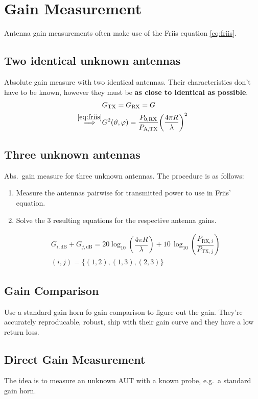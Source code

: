 \section{Gain Measurement}
Antenna gain measurements often make use of the Friis equation \eqref{eq:friis}.

\subsection{Two identical unknown antennas}

Absolute gain measure with two identical antennas.
Their characteristics don't have to be known, however they must be \textbf{as close to identical as possible}.
\begin{align}
  &G_{\text{TX}} = G_{\text{RX}} = G\nonumber\\
  \EqImplies{eq:friis} &G^{2}(\vartheta, \varphi) = \dfrac{P_{0,\text{RX}}}{P_{\text{A,TX}}} {\left(\dfrac{4\pi R}{\lambda}\right)}^{2}
\end{align}

\subsection{Three unknown antennas}
Abs.\ gain measure for three unknown antennas.
The procedure is as follows:
\begin{enumerate}
  \item Measure the antennas pairwise for transmitted power to use in Friis' equation.
  \item Solve the 3 resulting equations for the respective antenna gains.
\end{enumerate}

\begin{align*}
  &G_{{i,\text{dB}}} + G_{{j,\text{dB}}} = 20 \log_{10}\left(\dfrac{4\pi R}{\lambda}\right) + 10\,\log_{10}\left(\dfrac{P_{\text{RX},i}}{P_{\text{TX},j}}\right)\\
  &(i,j) = \{(1,2), (1,3), (2,3)\}
\end{align*}

\subsection{Gain Comparison}
Use a standard gain horn fo gain comparison to figure out the gain.
They're accurately reproducable, robust, ship with their gain curve and they have a low return loss.

\subsection{Direct Gain Measurement}
The idea is to measure an unknown AUT with a known probe, e.g.\ a standard gain horn.

